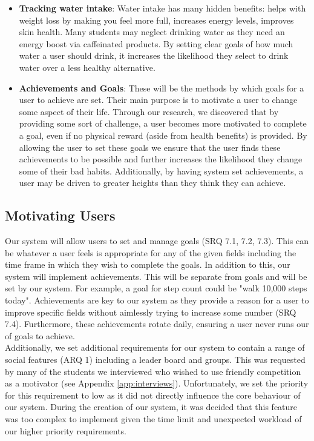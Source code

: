 \documentclass[11pt]{article}
\begin{document}
\begin{itemize}
    \item \textbf{Tracking water intake}: Water intake has many hidden
        benefits: helps with weight loss by making you feel more full,
        increases energy levels, improves skin health. Many students may
        neglect drinking water as they need an energy boost via caffeinated
        products. By setting clear goals of how much water a user should drink,
        it increases the likelihood they select to drink water over a less
        healthy alternative.

    \item \textbf{Achievements and Goals}: These will be the methods by which goals for a
        user to achieve are set. Their main purpose is to motivate a user to
        change some aspect of their life. Through our research, we discovered
        that by providing some sort of challenge, a user becomes more motivated
        to complete a goal, even if no physical reward (aside from health
        benefits) is provided. By allowing the user to set these goals we
        ensure that the user finds these achievements to be possible and
        further increases the likelihood they change some of their bad habits.
        Additionally, by having system set achievements, a user may be driven to
        greater heights than they think they can achieve.

\end{itemize}


\subsection{Motivating Users}

Our system will allow users to set and manage goals (SRQ 7.1, 7.2, 7.3). This can be whatever a user feels is appropriate for any of the given 
fields including the time frame in which they wish to complete the goals. In addition to this, our system will implement achievements.
This will be separate from goals and will be set by our system. For example, a goal for step count could be "walk 10,000 steps today".
Achievements are key to our system as they provide a reason for a user to improve specific fields
without aimlessly trying to increase some number (SRQ 7.4). Furthermore, these
achievements rotate daily, ensuring a user never runs our of goals to achieve.\\

Additionally, we set additional requirements for our system to contain a range
of social features (ARQ 1) including a leader board and groups. This was
requested by many of the students we interviewed who wished to use friendly
competition as a motivator (see Appendix \ref{app:interviews}). Unfortunately,
we set the priority for this requirement to low as it did not directly
influence the core behaviour of our system. During the creation of our system,
it was decided that this feature was too complex to implement  given the time
limit and unexpected workload of our higher priority requirements.
\end{document}
